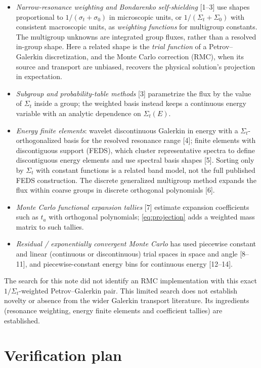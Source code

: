 \documentclass[11pt]{article}
\newcommand{\Sigt}{\Sigma_t}
\begin{document}
\begin{itemize}
  \item \emph{Narrow-resonance weighting and Bondarenko self-shielding} [1--3] use
  shapes proportional to $1/(\sigma_t+\sigma_0)$ in microscopic units, or
  $1/(\Sigma_t+\Sigma_0)$ with consistent macroscopic units, as
  \emph{weighting functions} for multigroup constants. The multigroup unknowns
  are integrated group fluxes, rather than a resolved in-group shape. Here a
  related shape is the
  \emph{trial function} of a Petrov--Galerkin discretization, and the Monte Carlo
  correction (RMC), when its source and transport are unbiased, recovers the
  physical solution's projection in expectation.
  \item \emph{Subgroup and probability-table methods} [3] parametrize the flux by the
  value of $\Sigt$ inside a group; the weighted basis instead keeps a continuous energy
  variable with an analytic dependence on $\Sigt(E)$.
  \item \emph{Energy finite elements}: wavelet discontinuous Galerkin in energy with a
  $\Sigt$-orthogonalized basis for the resolved resonance range [4]; finite elements
  with discontiguous support (FEDS), which cluster representative spectra to define
  discontiguous energy elements and use spectral basis shapes [5]. Sorting only
  by $\Sigt$ with constant functions is a related band model, not the full published
  FEDS construction. The discrete generalized multigroup method expands the flux
  within coarse groups in discrete orthogonal polynomials [6].
  \item \emph{Monte Carlo functional expansion tallies} [7] estimate expansion
  coefficients such as $t_a$ with orthogonal polynomials; \eqref{eq:projection} adds a
  weighted mass matrix to such tallies.
  \item \emph{Residual / exponentially convergent Monte Carlo} has used piecewise
  constant and linear (continuous or discontinuous) trial spaces in space and angle
  [8--11], and piecewise-constant energy bins for continuous energy [12--14].
\end{itemize}
The search for this note did not identify an RMC implementation with this exact
$1/\Sigt$-weighted Petrov--Galerkin pair. This limited search does not establish
novelty or absence from the wider Galerkin transport literature. Its ingredients
(resonance weighting, energy finite elements and coefficient tallies) are established.

\section{Verification plan}
\end{document}

